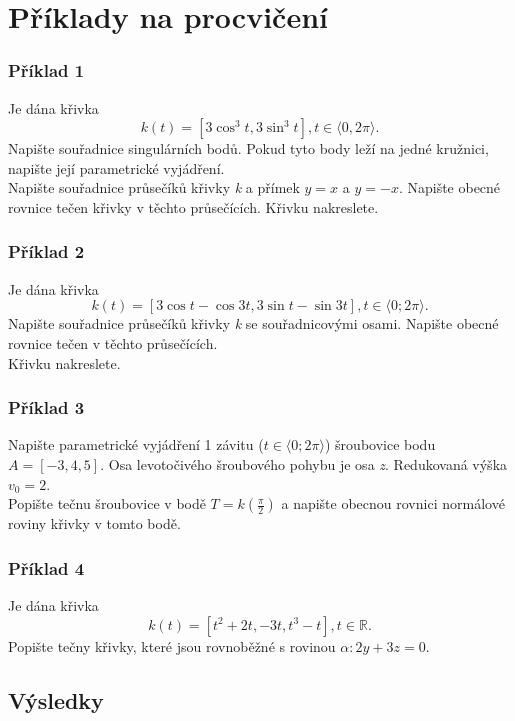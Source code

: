 \chapter{Příklady na procvičení}
\subsection*{Příklad 1}
Je dána křivka
$$k(t) = [3\cos^3{t}, 3\sin^3{t}], t \in \langle0, 2\pi\rangle.$$
Napište souřadnice singulárních bodů. Pokud tyto body leží na jedné kružnici, napište její
parametrické vyjádření. \\
Napište souřadnice průsečíků křivky \textit{k} a přímek $y=x$ a $y=-x$. Napište obecné
rovnice tečen křivky v těchto průsečících. Křivku nakreslete.
\subsection*{Příklad 2}
Je dána křivka
$$k(t) = [3\cos{t}-\cos{3t}, 3\sin{t}-\sin{3t}], t \in \langle0; 2\pi\rangle.$$	
Napište souřadnice průsečíků křivky \textit{k} se souřadnicovými osami. Napište obecné rovnice
tečen v těchto průsečících. \\
Křivku nakreslete.	
\subsection*{Příklad 3}
Napište parametrické vyjádření 1 závitu ($t \in \langle0; 2\pi\rangle$) šroubovice bodu $A=[-3,4,5]$.
Osa levotočivého šroubového pohybu je osa \textit{z}. Redukovaná výška $v_0=2$. \\
Popište tečnu šroubovice v bodě $T=k\left(\frac{\pi}{2}\right)$ a napište obecnou rovnici normálové
roviny křivky v tomto bodě.
\subsection*{Příklad 4}
Je dána křivka
$$k(t) = [t^2+2t, -3t, t^3-t], t \in \mathbb{R}.$$
Popište tečny křivky, které jsou rovnoběžné s rovinou $\alpha: 2y+3z=0$.
\clearpage
\section{Výsledky}
